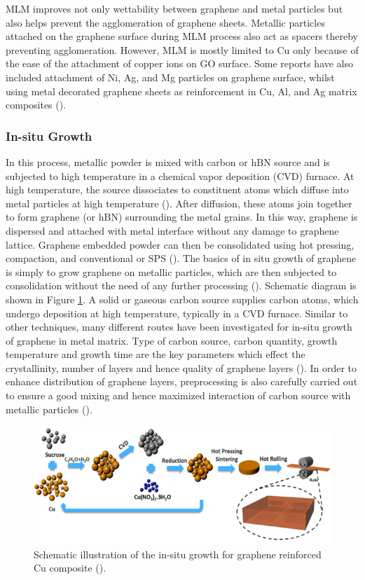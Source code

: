 MLM improves not only wettability between graphene and metal particles but also helps prevent the agglomeration of graphene sheets. Metallic particles attached on the graphene surface during MLM process also act as spacers thereby preventing agglomeration. However, MLM is mostly limited to Cu only because of the ease of the attachment of copper ions on GO surface. Some reports have also included attachment of Ni, Ag, and Mg particles on graphene surface, whilst using metal decorated graphene sheets as reinforcement in Cu, Al, and Ag matrix composites (\cite{xia2017unified}).

\subsubsection{In-situ Growth}
In this process, metallic powder is mixed with carbon or hBN source and is subjected to high temperature in a chemical vapor deposition (CVD) furnace. At high temperature, the source dissociates to constituent atoms which diffuse into metal particles at high temperature (\cite{cao2019thermal}). After diffusion, these atoms join together to form graphene (or hBN) surrounding the metal grains. In this way, graphene is dispersed and attached with metal interface without any damage to graphene lattice. Graphene embedded powder can then be consolidated using hot pressing, compaction, and conventional or SPS (\cite{fu2018approach}). The basics of in situ growth of graphene is simply to grow graphene on metallic particles, which are then subjected to consolidation without the need of any further processing (\cite{chen2016fabrication}). Schematic diagram is shown in Figure \ref{fig:in_situ_growth}. A solid or gaseous carbon source supplies carbon atoms, which undergo deposition at high temperature, typically in a CVD furnace. Similar to other techniques, many different routes have been investigated for in-situ growth of graphene in metal matrix. Type of carbon source, carbon quantity, growth temperature and growth time are the key parameters which effect the crystallinity, number of layers and hence quality of graphene layers (\cite{liu2017situ}). In order to enhance distribution of graphene layers, preprocessing is also carefully carried out to ensure a good mixing and hence maximized interaction of carbon source with metallic particles (\cite{guo2020situ}).

\begin{figure}[!htb]
\centering
\includegraphics[width=\linewidth]{graphics/chapter_1/in_situ_growth}
\caption{Schematic illustration of the in-situ growth for graphene reinforced Cu composite (\cite{guo2020situ}).}
\label{fig:in_situ_growth}
\end{figure}


